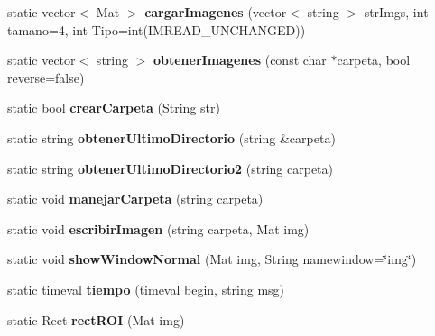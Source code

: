 \begin{DoxyCompactItemize}
\mbox{\label{classCommonFunctions_a35ffddd0b411b9a87e40743236827569}} 
static vector$<$ Mat $>$ {\bfseries cargar\+Imagenes} (vector$<$ string $>$ str\+Imgs, int tamano=4, int Tipo=int(I\+M\+R\+E\+A\+D\+\_\+\+U\+N\+C\+H\+A\+N\+G\+ED))
\item 
\mbox{\label{classCommonFunctions_a79ab98672a5297e53ea032a9ecf7ec02}} 
static vector$<$ string $>$ {\bfseries obtener\+Imagenes} (const char $\ast$carpeta, bool reverse=false)
\item 
\mbox{\label{classCommonFunctions_acb8852ee747cb715a16e6dd9126d560d}} 
static bool {\bfseries crear\+Carpeta} (String str)
\item 
\mbox{\label{classCommonFunctions_a9b3747c4d4a2bc6d897ba1ae2ec59f00}} 
static string {\bfseries obtener\+Ultimo\+Directorio} (string \&carpeta)
\item 
\mbox{\label{classCommonFunctions_af27fbe7fc5de24747ddf5a0496016301}} 
static string {\bfseries obtener\+Ultimo\+Directorio2} (string carpeta)
\item 
\mbox{\label{classCommonFunctions_a8f31532bc3dd60e5c95d40daaef7c705}} 
static void {\bfseries manejar\+Carpeta} (string carpeta)
\item 
\mbox{\label{classCommonFunctions_a1cbb74aeab1ac5dc96ba4871d0f07792}} 
static void {\bfseries escribir\+Imagen} (string carpeta, Mat img)
\item 
\mbox{\label{classCommonFunctions_a71529e35a71bbc74d49051d90a850c30}} 
static void {\bfseries show\+Window\+Normal} (Mat img, String namewindow=\char`\"{}img\char`\"{})
\item 
\mbox{\label{classCommonFunctions_a72ec70e251bf9b34409318b71e55d34e}} 
static timeval {\bfseries tiempo} (timeval begin, string msg)
\item 
\mbox{\label{classCommonFunctions_aaa36dbe5e5b5be0caf0af58306f333bf}} 
static Rect {\bfseries rect\+R\+OI} (Mat img)

\end{DoxyCompactItemize}
